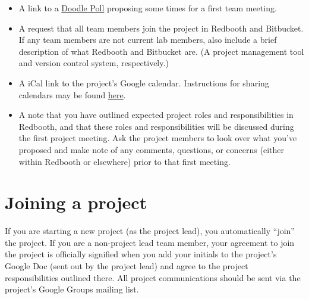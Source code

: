 \documentclass{tufte-book} %
\begin{document}
\begin{enumerate}
\begin{itemize}
\item A link to a \href{http://www.doodle.com}{Doodle
    Poll} proposing some times for a first team meeting.
\item A request that all team members join the project in Redbooth and
  Bitbucket.  If any team members are not current lab members, also
  include a brief description of what Redbooth and Bitbucket are.  (A
  project management tool and version control system, respectively.)
\item A iCal link to the project's Google calendar.  Instructions for
  sharing calendars may be found \href{https://support.google.com/calendar/answer/37082?hl=en}{here}.
\item A note that you have outlined expected project roles and
  responsibilities in Redbooth, and that these roles and
  responsibilities will be discussed during the first project
  meeting.  Ask the project members to look over what you've proposed
  and make note of any comments, questions, or concerns (either within
  Redbooth or elsewhere) prior to that first meeting.
\end{itemize}
\end{enumerate}

\section{Joining a project}
If you are starting a new project (as the project lead), you
automatically ``join'' the project.  If you are a non-project lead
team member, your agreement to join the project is officially
signified when you add your initials to the project's Google Doc (sent
out by the project lead) and agree to the project responsibilities
outlined there.  All project communications should be sent via the
project's Google Groups mailing list.


\newpage
\end{document}
